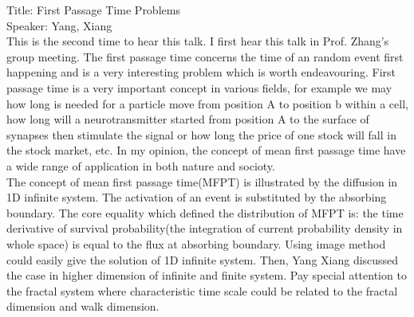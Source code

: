 \documentclass[fontsize=11pt, %
                             paper=a4, %
                             twoside, %
                             captions=tableheading,
                             index=totoc,
                             hyperref]{labbook}
\begin{document}
\begin{addmargin}[4cm]{0cm}
Title: First Passage Time Problems\\
Speaker: Yang, Xiang\\
This is the second time to hear this talk. I first hear this talk in Prof. Zhang's group meeting. The first passage time concerns the time of an random event first happening and is a very interesting problem which is worth endeavouring. First passage time is a very important concept in various fields, for example we may how long is needed for a particle move from position A to position b within a cell, how long will a neurotransmitter started from position A to the surface of  synapses then stimulate the signal or how long the price of one stock will fall in the stock market, etc. In my opinion, the concept of mean first passage time have a wide range of application in both nature and socioty. \\
The concept of mean first passage time(MFPT) is illustrated by the diffusion in 1D infinite system. The activation of an event is substituted by the absorbing boundary. The core equality which defined the distribution of MFPT is: the time derivative of survival probability(the integration of current probability density in whole space) is equal to the flux at absorbing boundary. Using image method could easily give the solution of 1D infinite system. Then, Yang Xiang discussed the case in higher dimension of infinite and finite system. Pay special attention to the fractal system where characteristic time scale could be related to the fractal dimension and walk dimension.


\end{addmargin}
\end{document}
